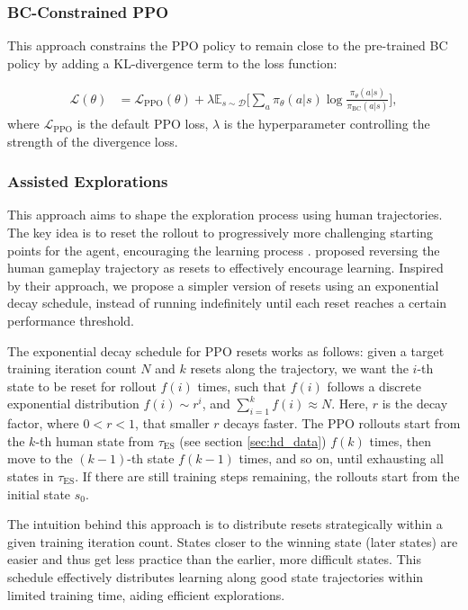 \documentclass{article}
\begin{document}
\subsubsection{BC-Constrained PPO}
This approach constrains the PPO policy to remain close to the pre-trained BC 
policy by adding a KL-divergence term to the loss function:

\begin{align*}
      \mathcal{L}(\theta) 
      &= \mathcal{L}_{\text{PPO}}(\theta) +
      \lambda \mathbb{E}_{s \sim \mathcal{D}} \bigg[ \sum_{a} \pi_{\theta}(a | s) \log 
      \frac{\pi_{\theta}(a | s)}{\pi_{\text{BC}}(a | s)} \bigg],
\end{align*}
where $\mathcal{L}_{\text{PPO}}$ is the default PPO loss, $\lambda$ is the hyperparameter
controlling the strength of the divergence loss.

\subsubsection{Assisted Explorations}
This approach aims to shape the exploration process using human trajectories. 
The key idea is to reset the rollout to progressively more challenging starting 
points for the agent, encouraging the learning process \cite{florensa2018reversecurriculumgenerationreinforcement}. 
\cite{salimans2018learningmontezumasrevengesingle} proposed reversing the human 
gameplay trajectory as resets to effectively encourage learning. Inspired by 
their approach, we propose a simpler version of resets using an exponential 
decay schedule, instead of running indefinitely until each reset reaches a 
certain performance threshold.

The exponential decay schedule for PPO resets works as follows: given a target 
training iteration count $N$ and $k$ resets along the trajectory, we want the 
$i$-th state to be reset for rollout $f(i)$ times, such that $f(i)$ follows a 
discrete exponential distribution $f(i) \sim r^i$, and $\sum_{i=1}^{k} f(i) 
\approx N$. Here, $r$ is the decay factor, where $0 < r < 1$, that smaller $r$ decays 
faster. The PPO rollouts start from the $k$-th human state from 
$\tau_{\text{ES}}$ (see section \ref{sec:hd_data}) $f(k)$ times, then move to 
the $(k-1)$-th state $f(k-1)$ times, and so on, until exhausting all states in 
$\tau_{\text{ES}}$. If there are still training steps remaining, the rollouts 
start from the initial state $s_0$.

The intuition behind this approach is to distribute resets strategically 
within a given training iteration count. States closer to the winning 
state (later states) are easier and thus get less practice than the 
earlier, more difficult states. This schedule effectively distributes 
learning along good state trajectories within limited training time, 
aiding efficient explorations.
\end{document}
